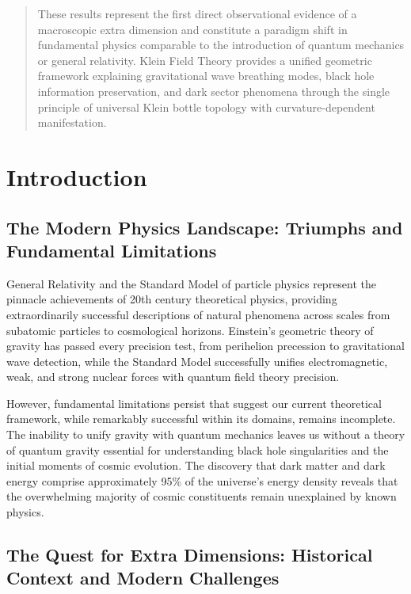 \documentclass[aps,prl,twocolumn,showpacs,superscriptaddress,groupedaddress]{revtex4-1}
\begin{document}
\begin{abstract}
These results represent the first direct observational evidence of a macroscopic extra dimension and constitute a paradigm shift in fundamental physics comparable to the introduction of quantum mechanics or general relativity. Klein Field Theory provides a unified geometric framework explaining gravitational wave breathing modes, black hole information preservation, and dark sector phenomena through the single principle of universal Klein bottle topology with curvature-dependent manifestation.
\end{abstract}


\maketitle

\section{\label{sec:intro}Introduction}

\subsection{The Modern Physics Landscape: Triumphs and Fundamental Limitations}

General Relativity and the Standard Model of particle physics represent the pinnacle achievements of 20th century theoretical physics, providing extraordinarily successful descriptions of natural phenomena across scales from subatomic particles to cosmological horizons. Einstein's geometric theory of gravity has passed every precision test, from perihelion precession to gravitational wave detection, while the Standard Model successfully unifies electromagnetic, weak, and strong nuclear forces with quantum field theory precision.

However, fundamental limitations persist that suggest our current theoretical framework, while remarkably successful within its domains, remains incomplete. The inability to unify gravity with quantum mechanics leaves us without a theory of quantum gravity essential for understanding black hole singularities and the initial moments of cosmic evolution. The discovery that dark matter and dark energy comprise approximately 95\% of the universe's energy density reveals that the overwhelming majority of cosmic constituents remain unexplained by known physics.

\subsection{The Quest for Extra Dimensions: Historical Context and Modern Challenges}
\end{document}

